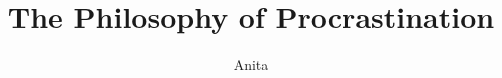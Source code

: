 \documentclass[
]{dissertation}
\title[Exploring the `Putting Things Off' Productivity System]{The Philosophy of Procrastination}
\author{Anita}{Break}
\begin{document}
  \frontmatter

  
  
  
  
  

  \mainmatter
  \thumbtrue    %

  
  
  

  \appendix

  

  \backmatter
  \thumbfalse   %

  
  
  
  
  
\end{document}
